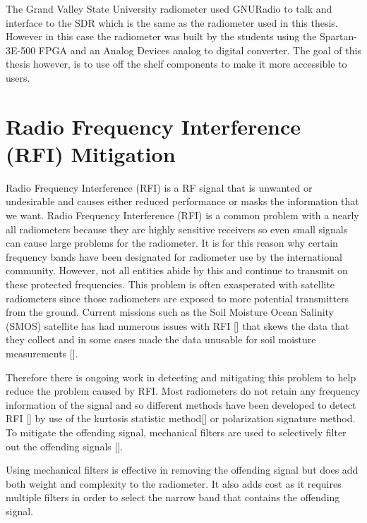 The Grand Valley State University radiometer used GNURadio to talk and interface to the SDR which is the same as the radiometer used in this thesis.  However in this case the radiometer was built by the students using the Spartan-3E-500 FPGA and an Analog Devices analog to digital converter.  The goal of this thesis however, is to use off the shelf components to make it more accessible to users.  

\section{Radio Frequency Interference (RFI) Mitigation}
Radio Frequency Interference (RFI) is a RF signal that is unwanted or undesirable and causes either reduced performance or masks the information that we want.  Radio Frequency Interference (RFI) is a common problem with a nearly all radiometers because they are highly sensitive receivers so even small signals can cause large problems for the radiometer.  It is for this reason why certain frequency bands have been designated for radiometer use by the international community.  However, not all entities abide by this and continue to transmit on these protected frequencies.  This problem is often exasperated with satellite radiometers since those radiometers are exposed to more potential transmitters from the ground.  Current missions such as the Soil Moisture Ocean Salinity (SMOS) satellite has had numerous issues with RFI [\cite{Kerr}] that skews the data that they collect and in some cases made the data unusable for soil moisture measurements [\cite{Richaume}].  

Therefore there is ongoing work in detecting and mitigating this problem to help reduce the problem caused by RFI.  Most radiometers do not retain any frequency information of the signal and so different methods have been developed to detect  RFI [\cite{Forte}] by use of the kurtosis statistic method[\cite{DeRoo}] or polarization signature method.  To mitigate the offending signal, mechanical filters are used to selectively filter out the offending signals [\cite{DeRooRFI}].  

Using mechanical filters is effective in removing the offending signal but does add both weight and complexity to the radiometer.  It also adds cost as it requires multiple filters in order to select the narrow band that contains the offending signal.


